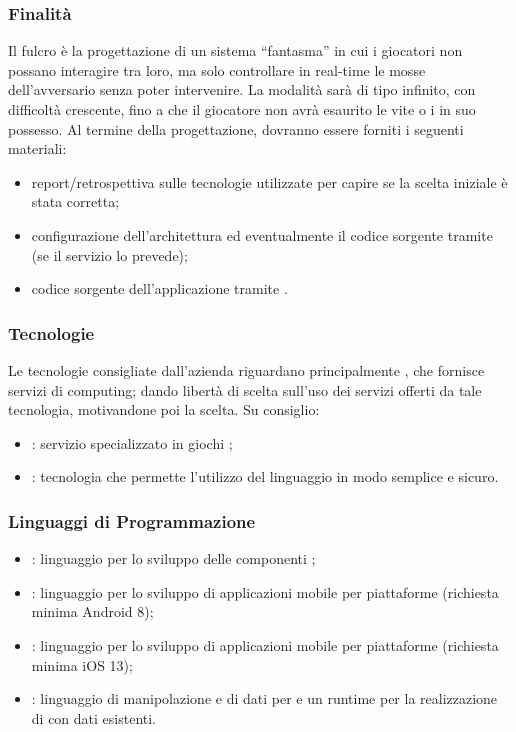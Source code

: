 \documentclass[]{article}
\begin{document}
		\subsubsection{Finalità}
		Il fulcro è la progettazione di un sistema  “fantasma” in cui i giocatori non possano interagire tra loro, ma solo controllare in real-time le mosse dell'avversario senza poter intervenire.
		La modalità  sarà di tipo infinito, con difficoltà crescente, fino a che il giocatore non avrà esaurito le vite o i  in suo possesso.
		Al termine della progettazione, dovranno essere forniti i seguenti materiali:
		\begin{itemize}
			\item report/retrospettiva sulle tecnologie utilizzate per capire se la scelta iniziale è stata corretta;
			\item configurazione dell'architettura  ed eventualmente il codice sorgente tramite  (se il servizio lo prevede);
			\item codice sorgente dell'applicazione tramite  .
		\end{itemize}

		\subsubsection{Tecnologie}
		Le tecnologie consigliate dall'azienda riguardano principalmente ,  che fornisce servizi di  computing; dando libertà di scelta sull'uso dei servizi offerti da tale tecnologia, motivandone poi la scelta.
		Su consiglio:
		\begin{itemize}
			\item {}: servizio specializzato in giochi ;
			\item {}: tecnologia che permette l'utilizzo del linguaggio  in modo semplice e sicuro.

		\end{itemize}

		\subsubsection{Linguaggi di Programmazione}
		\begin{itemize}
			\item {}: linguaggio per lo sviluppo delle componenti ;
			\item {}: linguaggio per lo sviluppo di applicazioni mobile per piattaforme  (richiesta minima Android 8);
			\item {}: linguaggio per lo sviluppo di applicazioni mobile per piattaforme (richiesta minima iOS 13);
			\item {}: linguaggio di manipolazione e  di dati  per  e un runtime per la realizzazione di  con dati esistenti.
		\end{itemize}
\end{document}
